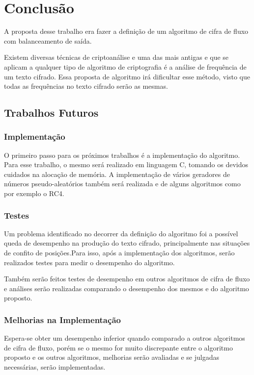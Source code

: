 \chapter{Conclusão}
\label{conclusion}

A proposta desse trabalho era fazer a definição de um algoritmo de cifra de fluxo com balanceamento de saída.

Existem diversas técnicas de criptoanálise e uma das mais antigas e que se aplicam a qualquer tipo de algoritmo de criptografia é a análise de frequência de um texto cifrado. Essa proposta de algoritmo irá dificultar esse método, visto que todas as frequências no texto cifrado serão as mesmas.

\section{Trabalhos Futuros}
\label{future-work}

	\subsection{Implementação}
	\label{implementation}
	
	O primeiro passo para os próximos trabalhos é a implementação do algoritmo. Para esse trabalho, o mesmo será realizado em linguagem C, tomando os devidos cuidados na alocação de memória. 
	A implementação de vários geradores de números pseudo-aleatórios também será realizada e de alguns algoritmos como por exemplo o RC4.
	
	\subsection{Testes}
	\label{tests}
	
	Um problema identificado no decorrer da definição do algoritmo foi a possível queda de desempenho na produção do texto cifrado, principalmente nas situações de confito de posições.Para isso, após a implementação dos algoritmos, serão realizados testes para medir o desempenho do algoritmo.
	
	Também serão feitos testes de desempenho em outros algoritmos de cifra de fluxo e análises serão realizadas comparando o desempenho dos mesmos e do algoritmo proposto.
	
	\subsection{Melhorias na Implementação}
	\label{improments}
	
	Espera-se obter um desempenho inferior quando comparado a outros algoritmos de cifra de fluxo, porém se o mesmo for muito discrepante entre o algoritmo proposto e os outros algoritmos, melhorias serão avaliadas e se julgadas necessárias, serão implementadas.
	